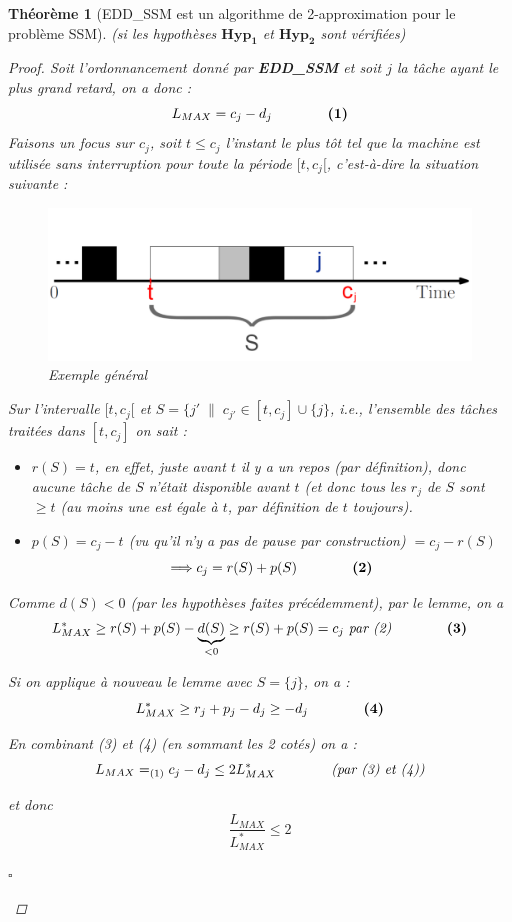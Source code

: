 \documentclass[12pt]{article}
\newcommand{\cqfd}{\begin{flushright}$\square$\end{flushright}}
\newtheorem{thm}{Th\'eor\`eme}[section]
\newtheorem{proof}{Preuve}[section]
\begin{document}
\begin{thm}[EDD\_SSM est un algorithme de 2-approximation pour le problème SSM]
(si les hypothèses $\mathbf{Hyp_1}$ et $\mathbf{Hyp_2}$ sont vérifiées)
\begin{proof}
Soit l'ordonnancement donné par \textbf{EDD\_SSM} et soit $j$ la tâche ayant le
plus grand retard, on a donc : $$L_{MAX} = c_j - d_j\qquad\qquad
\text{\textbf{(1)}}$$ Faisons un focus sur $c_j$, soit $t \leq c_j$ l'instant le
plus tôt tel que la machine est utilisée sans interruption pour toute la
période $[t,c_j[$, c'est-à-dire la situation suivante :

\begin{figure}[h!]
    \begin{center}
    \includegraphics[scale=0.25]{ssm.pdf}
    \caption{Exemple général}
    \end{center}
\end{figure}

\noindent Sur l'intervalle $[t,c_j[$ et $S = \{j' \; \| \; c_{j'} \in [t, c_j] \cup \{j\}$, i.e., l'ensemble des tâches traitées dans $[t, c_j]$ on sait :
\begin{itemize}
\item[$\bigstar$] $r(S) = t$, en effet, juste avant $t$ il y a un repos
(par définition), donc aucune tâche de $S$ n'était disponible avant $t$ (et donc
tous les $r_j$ de $S$ sont $\geq t$ (au moins une est égale à $t$, par
définition de $t$ toujours).
\item[$\bigstar$] $p(S) = c_j - t$ (vu qu'il n'y a pas de pause par
construction) $= c_j - r(S)$
$$\Longrightarrow c_j = r(S)+p(S) \qquad\qquad \text{\textbf{(2)}}$$
\end{itemize}
Comme $d(S) < 0$ \textit{(par les hypothèses faites précédemment)}, par le
lemme, on a $$L^*_{MAX} \geq r(S) + p(S) - \underbrace{d(S)}_{<0} \geq r(S)+p(S) = c_j\
\text{\textit{par (2)}}\qquad\qquad \text{\textbf{(3)}}$$

Si on applique à nouveau le lemme avec $S = \{j\}$, on a :
$$L^*_{MAX} \geq r_j + p_j - d_j \geq -d_j\qquad\qquad \text{\textbf{(4)}}$$

En combinant (3) et (4) (en sommant les 2 cotés) on a :
$$L_{MAX} =_{(1)} c_j - d_j \leq 2L^*_{MAX}\qquad\qquad
\text{\textit{(par (3) et (4))}}$$

et donc $$\frac{L_{MAX}}{L^*_{MAX}} \leq 2$$
\cqfd
\end{proof}
\end{thm}
\end{document}
